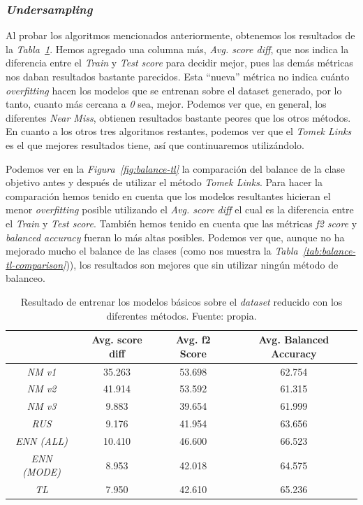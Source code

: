 \subsubsection{\textit{Undersampling}}

Al probar los algoritmos mencionados anteriormente, obtenemos los resultados de la \textit{Tabla\ \ref{tab:undersampling-methods}}. 
Hemos agregado una columna más, \textit{Avg. score diff}, que nos indica la diferencia entre el \textit{Train} y \textit{Test score} para decidir mejor, pues las demás métricas nos daban resultados bastante parecidos. Esta ``nueva'' métrica no indica cuánto \textit{overfitting} hacen los modelos que se entrenan sobre el dataset generado, por lo tanto, cuanto más cercana a \textit{0} sea, mejor. Podemos ver que, en general, los diferentes \textit{Near Miss}, obtienen resultados bastante peores que los otros métodos. En cuanto a los otros tres algoritmos restantes, podemos ver que el \textit{Tomek Links} es el que mejores resultados tiene, así que continuaremos utilizándolo.

Podemos ver en la \textit{Figura\ \ref{fig:balance-tl}} la comparación del balance de la clase objetivo antes y después de utilizar el método \textit{Tomek Links}. Para hacer la comparación hemos tenido en cuenta que los modelos resultantes hicieran el menor \textit{overfitting} posible utilizando el \textit{Avg. score diff} el cual es la diferencia entre el \textit{Train} y \textit{Test score}. También hemos tenido en cuenta que las métricas \textit{f2 score} y \textit{balanced accuracy} fueran lo más altas posibles. Podemos ver que, aunque no ha mejorado mucho el balance de las clases (como nos muestra la \textit{Tabla\ \ref{tab:balance-tl-comparison}})), los resultados son mejores que sin utilizar ningún método de balanceo.

\begin{table}[!ht]
    \centering
    \begin{tabular}{|c|ccc|} \hline
        & Avg. score diff & Avg. f2 Score & Avg. Balanced Accuracy \\ \hline
        \textit{NM v1} & 35.263 & 53.698 & 62.754 \\
        \textit{NM v2} & 41.914 & 53.592 & 61.315 \\
        \textit{NM v3} & 9.883 & 39.654 & 61.999 \\
        \textit{RUS} & 9.176 & 41.954 & 63.656 \\
        \textit{ENN (ALL)} & 10.410 & 46.600 & 66.523 \\
        \textit{ENN (MODE)} & 8.953 & 42.018 & 64.575 \\
        \textit{TL} & 7.950 & 42.610 & 65.236 \\ \hline
    \end{tabular}
    \caption{Resultado de entrenar los modelos básicos sobre el \textit{dataset} reducido con los diferentes métodos. Fuente: propia.}\ \label{tab:undersampling-methods}
\end{table}

